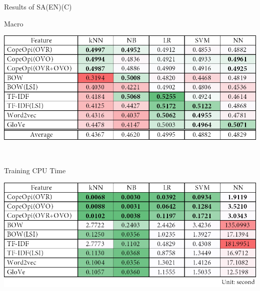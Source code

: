 \begin{table}[H]
\caption{Results of SA(EN)(C)}
\label{tab:sa_en_c}
\centering
\begin{subtable}{\textwidth}
	\centering
	\caption{Macro \fscore{}}
	\includegraphics[width=\resultfigwidth]{chapters/ch4/table/sa/SA(EN)(C).png}
\end{subtable}
\\[\tblskip]
\begin{subtable}{\textwidth}
	\centering
	\caption{Training CPU Time}
	\includegraphics[width=\resultfigwidth]{chapters/ch4/table/sa/SA(EN)(C)T.png}
\end{subtable}
\end{table}